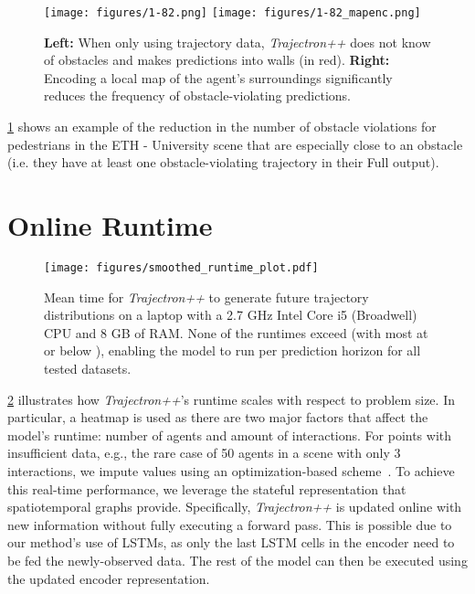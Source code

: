 \documentclass[runningheads]{llncs}
\newcommand{\algname}{\mbox{Trajectron++}}
\newcommand{\emphalgname}{\emph{\algname}}
\begin{document}
\begin{figure}[t]
    \centering
    \texttt{[image: figures/1-82.png]}
    \texttt{[image: figures/1-82\_mapenc.png]}
    \caption{\textbf{Left:} When only using trajectory data, \emphalgname{} does not know of obstacles and makes predictions into walls (in red). \textbf{Right:} Encoding a local map of the agent's surroundings significantly reduces the frequency of obstacle-violating predictions.}
    \label{fig:supp_eth_map_quali}
\end{figure}

\cref{fig:supp_eth_map_quali} shows an example of the reduction in the number of obstacle violations for pedestrians in the ETH - University scene that are especially close to an obstacle (i.e. they have at least one obstacle-violating trajectory in their Full output).

\section{Online Runtime}

\begin{figure}[t]
    \centering
    \texttt{[image: figures/smoothed\_runtime\_plot.pdf]}
    \caption{Mean time for \emphalgname{} to generate future trajectory distributions on a laptop with a 2.7 GHz Intel Core i5 (Broadwell) CPU and 8 GB of RAM. None of the runtimes exceed  (with most at or below ), enabling the model to run  per prediction horizon for all tested datasets.}
    \label{fig:supp_runtime}
    \vspace{3mm}
\end{figure}

\cref{fig:supp_runtime} illustrates how \emphalgname{}'s runtime scales with respect to problem size. In particular, a heatmap is used as there are two major factors that affect the model's runtime: number of agents and amount of interactions. For points with insufficient data, e.g., the rare case of 50 agents in a scene with only 3 interactions, we impute values using an optimization-based scheme~\cite{HallacLeskovecEtAl2015}.
To achieve this real-time performance, we leverage the stateful representation that spatiotemporal graphs provide. Specifically, \emphalgname{} is updated online with new information without fully executing a forward pass. This is possible due to our method's use of LSTMs, as only the last LSTM cells in the encoder need to be fed the newly-observed data. The rest of the model can then be executed using the updated encoder representation.
 
\end{document}
